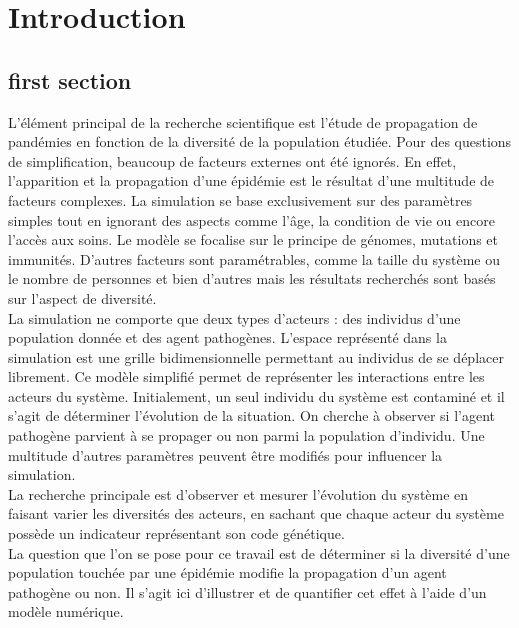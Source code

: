 \chapter{Introduction} \label{ch:introduction}



\section{first section}
L'élément principal de la recherche scientifique est l'étude de propagation de pandémies en fonction de la diversité de la population étudiée. Pour des questions de simplification, beaucoup de facteurs externes ont été ignorés. En effet, l'apparition et la propagation d'une épidémie est le résultat d'une multitude de facteurs complexes. La simulation se base exclusivement sur des paramètres simples tout en ignorant des aspects comme l'âge, la condition de vie ou encore l'accès aux soins. Le modèle se focalise sur le principe de génomes, mutations et immunités. D'autres facteurs sont paramétrables, comme la taille du système ou le nombre de personnes et bien d'autres mais les résultats recherchés sont basés sur l'aspect de diversité.\\

La simulation ne comporte que deux types d'acteurs : des individus d'une population donnée et des agent pathogènes. L'espace représenté dans la simulation est une grille bidimensionnelle permettant au individus de se déplacer librement. Ce modèle simplifié permet de représenter les interactions entre les acteurs du système. Initialement, un seul individu du système est contaminé et il s'agit de déterminer l'évolution de la situation. On cherche à observer si l'agent pathogène parvient à se propager ou non parmi la population d'individu. Une multitude d'autres paramètres peuvent être modifiés pour influencer la simulation.\\

La recherche principale est d'observer et mesurer l'évolution du système en faisant varier les diversités des acteurs, en sachant que chaque acteur du système possède un indicateur représentant son code génétique.\\

La question que l'on se pose pour ce travail est de déterminer si la diversité d'une population touchée par une épidémie modifie la propagation d'un agent pathogène ou non. Il s'agit ici d'illustrer et de quantifier cet effet à l'aide d'un modèle numérique.